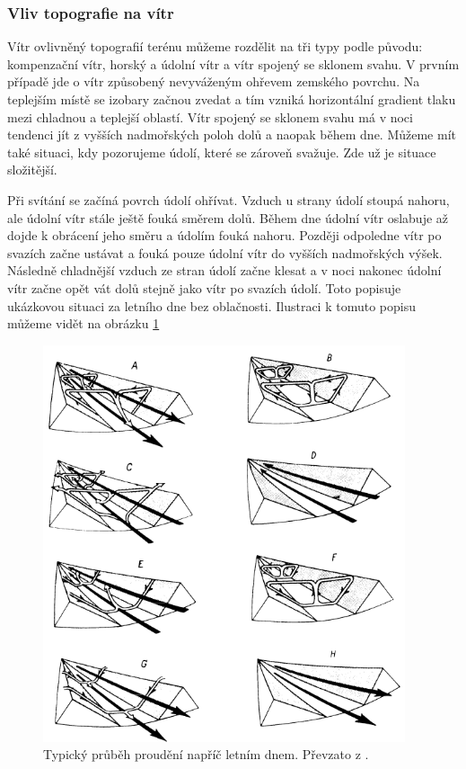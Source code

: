 \subsubsection{Vliv topografie na vítr}
Vítr ovlivněný topografií terénu můžeme rozdělit na tři typy podle původu: kompenzační vítr, horský a údolní vítr a vítr spojený se sklonem svahu. V prvním případě jde o vítr způsobený nevyváženým ohřevem zemského povrchu. Na teplejším místě se izobary začnou zvedat a tím vzniká horizontální gradient tlaku mezi chladnou a teplejší oblastí. Vítr spojený se sklonem svahu má v noci tendenci jít z vyšších nadmořských poloh dolů a naopak během dne. Můžeme mít také situaci, kdy pozorujeme údolí, které se zároveň svažuje. Zde už je situace složitější.

Při svítání se začíná povrch údolí ohřívat. Vzduch u strany údolí stoupá nahoru, ale údolní vítr stále ještě fouká směrem dolů. Během dne údolní vítr oslabuje až dojde k obrácení jeho směru a údolím fouká nahoru. Později odpoledne vítr po svazích začne ustávat a fouká pouze údolní vítr do vyšších nadmořských výšek. Následně chladnější vzduch ze stran údolí začne klesat a v noci nakonec údolní vítr začne opět vát dolů stejně jako vítr po svazích údolí. Toto popisuje ukázkovou situaci za letního dne bez oblačnosti. Ilustraci k tomuto popisu můžeme vidět na obrázku \ref{fig:valley_winds}

\begin{figure}
	\centering
	\includegraphics[width=0.95\textwidth]{img/ch1/valley_winds.png}
	\caption{Typický průběh proudění napříč letním dnem. Převzato z \cite{alma}.}
	\label{fig:valley_winds}
\end{figure}

